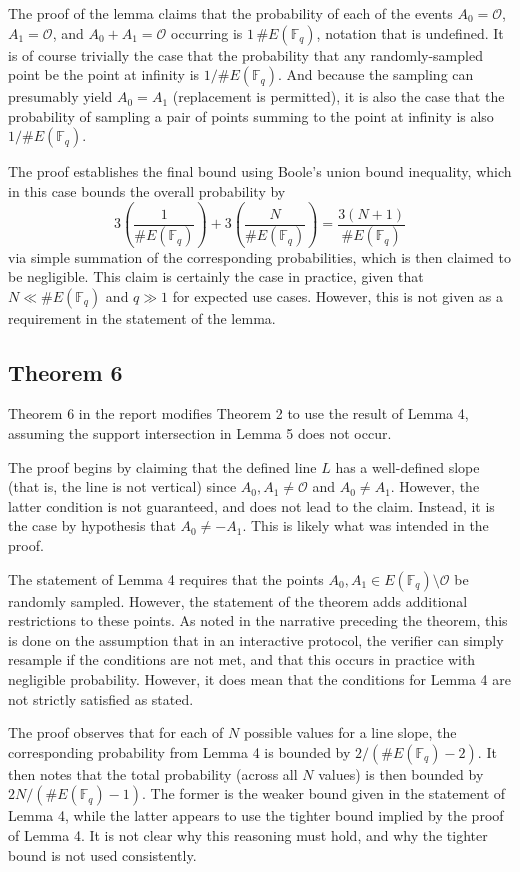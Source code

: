 \documentclass{article}
\begin{document}
The proof of the lemma claims that the probability of each of the events $A_0 = \mathcal{O}$, $A_1 = \mathcal{O}$, and $A_0 + A_1 = \mathcal{O}$ occurring is $1\, \# E(\mathbb{F}_q)$, notation that is undefined.
It is of course trivially the case that the probability that any randomly-sampled point be the point at infinity is $1 / \# E(\mathbb{F}_q)$.
And because the sampling can presumably yield $A_0 = A_1$ (replacement is permitted), it is also the case that the probability of sampling a pair of points summing to the point at infinity is also $1 / \# E(\mathbb{F}_q)$.

The proof establishes the final bound using Boole's union bound inequality, which in this case bounds the overall probability by
$$3 \left( \frac{1}{\# E(\mathbb{F}_q)} \right) + 3 \left( \frac{N}{\# E(\mathbb{F}_q)} \right) = \frac{3(N + 1)}{\# E(\mathbb{F}_q)}$$
via simple summation of the corresponding probabilities, which is then claimed to be negligible.
This claim is certainly the case in practice, given that $N \ll \# E(\mathbb{F}_q)$ and $q \gg 1$ for expected use cases.
However, this is not given as a requirement in the statement of the lemma.


\subsection{Theorem 6}

Theorem 6 in the report modifies Theorem 2 to use the result of Lemma 4, assuming the support intersection in Lemma 5 does not occur.

The proof begins by claiming that the defined line $L$ has a well-defined slope (that is, the line is not vertical) since $A_0, A_1 \neq \mathcal{O}$ and $A_0 \neq A_1$.
However, the latter condition is not guaranteed, and does not lead to the claim.
Instead, it is the case by hypothesis that $A_0 \neq -A_1$.
This is likely what was intended in the proof.

The statement of Lemma 4 requires that the points $A_0, A_1 \in E(\mathbb{F}_q) \setminus \mathcal{O}$ be randomly sampled.
However, the statement of the theorem adds additional restrictions to these points.
As noted in the narrative preceding the theorem, this is done on the assumption that in an interactive protocol, the verifier can simply resample if the conditions are not met, and that this occurs in practice with negligible probability.
However, it does mean that the conditions for Lemma 4 are not strictly satisfied as stated.

The proof observes that for each of $N$ possible values for a line slope, the corresponding probability from Lemma 4 is bounded by $2 / (\# E(\mathbb{F}_q) - 2)$.
It then notes that the total probability (across all $N$ values) is then bounded by $2 N / (\# E(\mathbb{F}_q) - 1)$.
The former is the weaker bound given in the statement of Lemma 4, while the latter appears to use the tighter bound implied by the proof of Lemma 4.
It is not clear why this reasoning must hold, and why the tighter bound is not used consistently.
\end{document}
